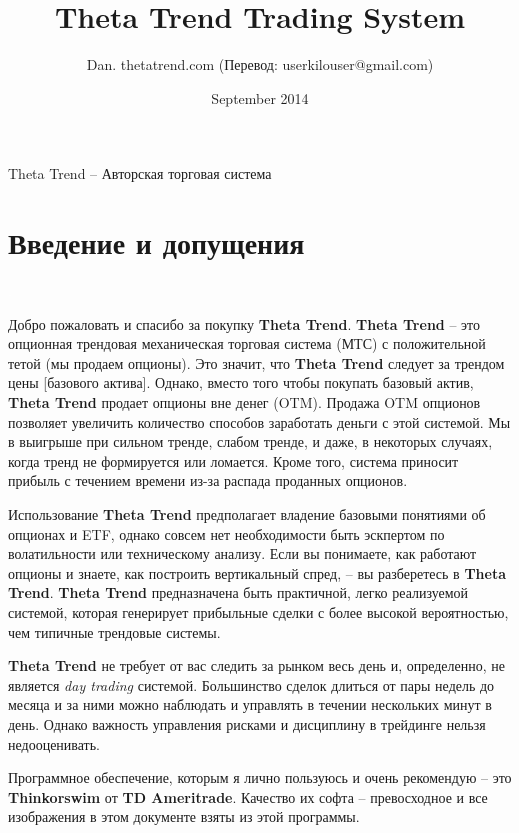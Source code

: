 \documentclass[12pt,DIV=18]{scrartcl}
\title{Theta Trend Trading System}
\author{Dan. thetatrend.com (Перевод: userkilouser@gmail.com)}
\date{September 2014}
\begin{document}
\maketitle
Theta Trend -- Авторская торговая система


\tableofcontents

\section*{Введение и допущения}
\label{intro}
\textcolor{White}{.}

Добро пожаловать и спасибо за покупку \textbf{Theta Trend}. \textbf{Theta Trend} -- это опционная трендовая механическая торговая система (МТС) с положительной тетой (мы продаем опционы). Это значит, что \textbf{Theta Trend} следует за трендом цены [базового актива]. Однако, вместо того чтобы покупать базовый актив, \textbf{Theta Trend} продает опционы вне денег (OTM). Продажа OTM опционов позволяет увеличить количество способов заработать деньги с этой системой. Мы в выигрыше при сильном тренде, слабом тренде, и даже, в некоторых случаях, когда тренд не формируется или ломается. Кроме того, система приносит прибыль с течением времени из-за распада проданных опционов.

\bigskip

Использование \textbf{Theta Trend} предполагает владение базовыми понятиями об опционах и ETF, однако совсем нет необходимости быть эскпертом по волатильности или техническому анализу. Если вы понимаете, как работают опционы и знаете, как построить вертикальный спред, -- вы разберетесь в \textbf{Theta Trend}. \textbf{Theta Trend} предназначена быть практичной, легко реализуемой системой, которая генерирует прибыльные сделки с более высокой вероятностью, чем типичные трендовые системы.

\bigskip

\textbf{Theta Trend} не требует от вас следить за рынком весь день и, определенно, не является \textit{day trading} системой. Большинство сделок длиться от пары недель до месяца и за ними можно наблюдать и управлять в течении нескольких минут в день. Однако важность управления рисками и дисциплину в трейдинге нельзя недооценивать.

\bigskip

Программное обеспечение, которым я лично пользуюсь и очень рекомендую -- это \textbf{Thinkorswim} от \textbf{TD Ameritrade}. Качество их софта -- превосходное и все изображения в этом документе взяты из этой программы.
\end{document}

